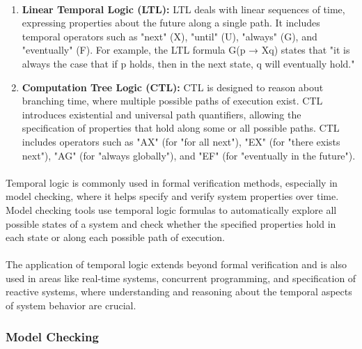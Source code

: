\paragraph*{}
\begin{enumerate}
	\item \textbf{Linear Temporal Logic (LTL):} LTL deals with linear sequences of time, expressing properties about the future along a single path. It includes temporal operators such as "next" (X), "until" (U), "always" (G), and "eventually" (F). For example, the LTL formula G(p → Xq) states that "it is always the case that if p holds, then in the next state, q will eventually hold."
	\item \textbf{Computation Tree Logic (CTL):} CTL is designed to reason about branching time, where multiple possible paths of execution exist. CTL introduces existential and universal path quantifiers, allowing the specification of properties that hold along some or all possible paths. CTL includes operators such as "AX" (for "for all next"), "EX" (for "there exists next"), "AG" (for "always globally"), and "EF" (for "eventually in the future").
\end{enumerate}
\paragraph*{}
Temporal logic is commonly used in formal verification methods, especially in model checking, where it helps specify and verify system properties over time. Model checking tools use temporal logic formulas to automatically explore all possible states of a system and check whether the specified properties hold in each state or along each possible path of execution.
\paragraph*{}
The application of temporal logic extends beyond formal verification and is also used in areas like real-time systems, concurrent programming, and specification of reactive systems, where understanding and reasoning about the temporal aspects of system behavior are crucial.
\paragraph*{}
\subsubsection{Model Checking}
